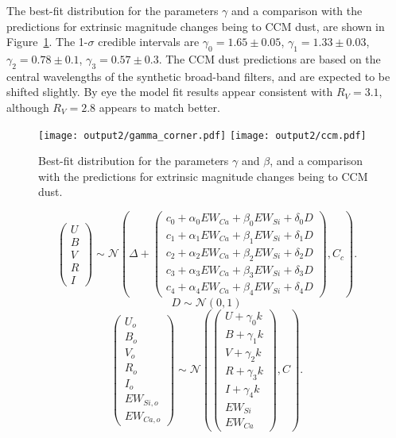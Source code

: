 \documentclass[11pt, oneside]{article}   	%
\begin{document}
The best-fit distribution for the parameters $\gamma$  and a comparison with the predictions for extrinsic
magnitude changes being to CCM dust, are shown in Figure~\ref{gamma:fig}.  The 1-$\sigma$ 
credible intervals are $\gamma_0=1.65 \pm 0.05$,
$\gamma_1 = 1.33  \pm 0.03$, $\gamma_2 = 0.78  \pm 0.1$, $\gamma_3 = 0.57  \pm 0.3$.
The CCM dust predictions are based 
on the central wavelengths of the synthetic broad-band filters, and are expected to be shifted slightly.
By eye the model fit results appear consistent with $R_V=3.1$, although $R_V=2.8$ appears to match better.
\begin{figure}[htbp] %
   \centering
   \texttt{[image: output2/gamma\_corner.pdf]} 
   \texttt{[image: output2/ccm.pdf]} 
   \caption{Best-fit distribution for the parameters $\gamma$ and $\beta$, and a comparison with the predictions for extrinsic
magnitude changes being to CCM dust.}
   \label{gamma:fig}
\end{figure}

\begin{equation*}
\left(
\begin{matrix}
U\\B\\V\\R\\I
\end{matrix}
\right) \sim \mathcal{N}
\left(
\Delta +
\left(
\begin{matrix}
c_0+\alpha_0 EW_{Ca} + \beta_0 EW_{Si} +\delta_0 D \\
c_1+\alpha_1 EW_{Ca} + \beta_1 EW_{Si} +\delta_1 D  \\
c_2+\alpha_2 EW_{Ca} + \beta_2 EW_{Si} +\delta_2 D \\
c_3+\alpha_3 EW_{Ca} + \beta_3 EW_{Si} +\delta_3 D \\
c_4+\alpha_4 EW_{Ca} + \beta_4 EW_{Si}+\delta_4 D 
\end{matrix}
\right)
,C_{c}
\right).
\end{equation*}
\begin{equation*}
D \sim \mathcal{N}(0,1)
\end{equation*}
\begin{equation*}
\left(
\begin{matrix}
U_o\\B_o\\ V_o\\R_o\\I_o\\EW_{Si, o}\\ EW_{Ca, o}
\end{matrix}
\right) \sim \mathcal{N}
\left(
\left(
\begin{matrix}
U +\gamma_0 k \\B +\gamma_1 k \\V+\gamma_2 k\\R+\gamma_3 k\\I+\gamma_4 k\\
EW_{Si}\\ EW_{Ca}
\end{matrix}
\right)
,C
\right).
\end{equation*}
\end{document}

